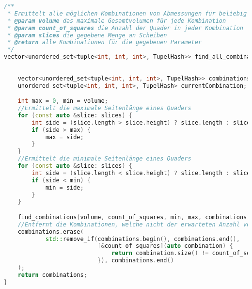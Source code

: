 \documentclass[a4paper,10pt,ngerman]{scrartcl}
\begin{document}
    \begin{lstlisting}[frame=single,language=C++,title=Methode find\_all\_combinations,breaklines=true,label={lst:code_findAllCombinations}]
/**
 * Ermittelt alle möglichen Kombinationen von Abmessungen für beliebig viele Quader
 * @param volume das maximale Gesamtvolumen für jede Kombination
 * @param count_of_squares die Anzahl der Quader in jeder Kombination
 * @param slices die gegebene Menge an Scheiben
 * @return alle Kombinationen für die gegebenen Parameter
 */
vector<unordered_set<tuple<int, int, int>, TupelHash>> find_all_combinations(int volume,
                                                                             int count_of_squares,
                                                                             const vector<Slice> &slices) {
    vector<unordered_set<tuple<int, int, int>, TupelHash>> combinations;
    unordered_set<tuple<int, int, int>, TupelHash> currentCombination;

    int max = 0, min = volume;
    //Ermittelt die maximale Seitenlänge eines Quaders
    for (const auto &slice: slices) {
        int side = (slice.length > slice.height) ? slice.length : slice.height;
        if (side > max) {
            max = side;
        }
    }
    //Ermittelt die minimale Seitenlänge eines Quaders
    for (const auto &slice: slices) {
        int side = (slice.length < slice.height) ? slice.length : slice.height;
        if (side < min) {
            min = side;
        }
    }

    find_combinations(volume, count_of_squares, min, max, combinations, currentCombination);
    //Entfernt die Kombinationen, welche nicht der erwarteten Anzahl von Quadern entsprechen
    combinations.erase(
            std::remove_if(combinations.begin(), combinations.end(),
                           [&count_of_squares](auto combination) {
                               return combination.size() != count_of_squares;
                           }), combinations.end()
    );
    return combinations;
}
    \end{lstlisting}
\end{document}
